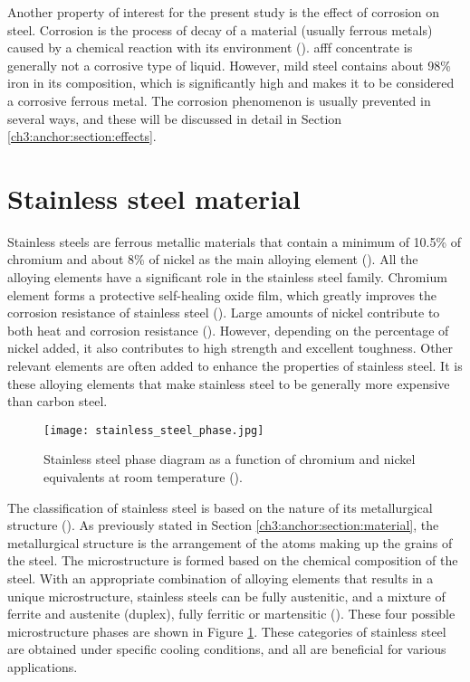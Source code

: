 Another property of interest for the present study is the effect of corrosion on steel. Corrosion is the process of decay of a material (usually ferrous metals) caused by a chemical reaction with its environment (\cite{islam2018effects}). \acrshort{afff} concentrate is generally not a corrosive type of liquid. However, mild steel contains about 98\% iron in its composition, which is significantly high and makes it to be considered a corrosive ferrous metal.  The corrosion phenomenon is usually prevented in several ways, and these will be discussed in detail in Section \ref{ch3:anchor:section:effects}.


\section{Stainless steel material} 
Stainless steels are ferrous metallic materials that contain a minimum of 10.5\% of chromium and about 8\% of nickel as the main alloying element (\cite{sourmail2005stainless}). All the alloying elements have a significant role in the stainless steel family. Chromium element forms a protective self-healing oxide film, which greatly improves the corrosion resistance of stainless steel (\cite{molabe2018determining}). Large amounts of nickel contribute to both heat and corrosion resistance (\cite{george2002introduction}). However, depending on the percentage of nickel added, it also contributes to high strength and excellent toughness. Other relevant elements are often added to enhance the properties of stainless steel. It is these alloying elements that make stainless steel to be generally more expensive than carbon steel.

\begin{figure}[H]
    \centering
    \texttt{[image: stainless\_steel\_phase.jpg]}
    \caption{Stainless steel phase diagram as a function of chromium and nickel equivalents at room temperature (\cite{bhadeshia2017steels}).}
    \label{ch3:figure:steel_phase}
\end{figure}

The classification of stainless steel is based on the nature of its metallurgical structure (\cite{bhadeshia2017steels}). As previously stated in Section \ref{ch3:anchor:section:material}, the metallurgical structure is the arrangement of the atoms making up the grains of the steel. The microstructure is formed based on the chemical composition of the steel. With an appropriate combination of alloying elements that results in a unique microstructure, stainless steels can be fully austenitic, and a mixture of ferrite and austenite (duplex), fully ferritic or martensitic (\cite{bhadeshia2017steels}). These four possible microstructure phases are shown in Figure \ref{ch3:figure:steel_phase}. These categories of stainless steel are obtained under specific cooling conditions, and all are beneficial for various applications.
 
